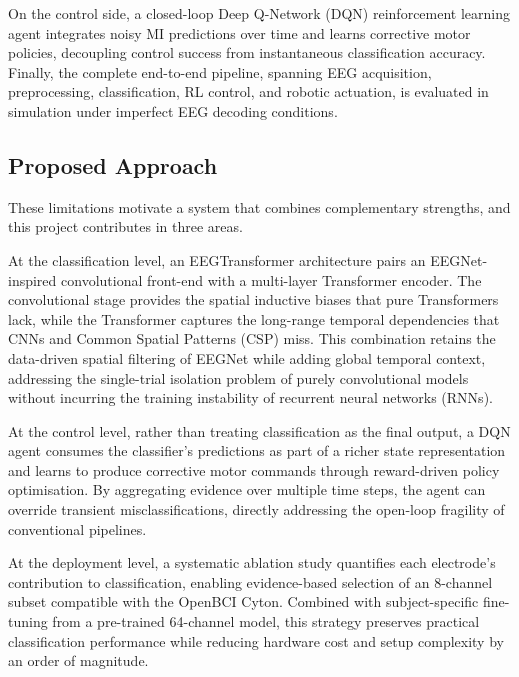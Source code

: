 \documentclass[12pt, a4paper]{article}
\begin{document}
On the control side, a closed-loop Deep Q-Network (DQN) reinforcement learning agent integrates noisy MI predictions over time and learns corrective motor policies, decoupling control success from instantaneous classification accuracy. Finally, the complete end-to-end pipeline, spanning EEG acquisition, preprocessing, classification, RL control, and robotic actuation, is evaluated in simulation under imperfect EEG decoding conditions.

\subsection{Proposed Approach}

These limitations motivate a system that combines complementary strengths, and this project contributes in three areas.

At the classification level, an EEGTransformer architecture pairs an EEGNet-inspired convolutional front-end with a multi-layer Transformer encoder. The convolutional stage provides the spatial inductive biases that pure Transformers lack, while the Transformer captures the long-range temporal dependencies that CNNs and Common Spatial Patterns (CSP) miss. This combination retains the data-driven spatial filtering of EEGNet while adding global temporal context, addressing the single-trial isolation problem of purely convolutional models without incurring the training instability of recurrent neural networks (RNNs).

At the control level, rather than treating classification as the final output, a DQN agent consumes the classifier's predictions as part of a richer state representation and learns to produce corrective motor commands through reward-driven policy optimisation. By aggregating evidence over multiple time steps, the agent can override transient misclassifications, directly addressing the open-loop fragility of conventional pipelines.

At the deployment level, a systematic ablation study quantifies each electrode's contribution to classification, enabling evidence-based selection of an 8-channel subset compatible with the OpenBCI Cyton. Combined with subject-specific fine-tuning from a pre-trained 64-channel model, this strategy preserves practical classification performance while reducing hardware cost and setup complexity by an order of magnitude.
\end{document}
